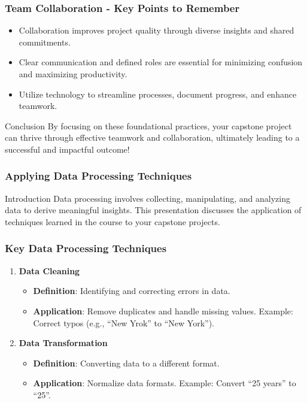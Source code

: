 \documentclass[aspectratio=169]{beamer}
\begin{document}
\begin{frame}[fragile]
    \frametitle{Team Collaboration - Key Points to Remember}
    \begin{itemize}
        \item Collaboration improves project quality through diverse insights and shared commitments.
        \item Clear communication and defined roles are essential for minimizing confusion and maximizing productivity.
        \item Utilize technology to streamline processes, document progress, and enhance teamwork.
    \end{itemize}
    
    \begin{block}{Conclusion}
        By focusing on these foundational practices, your capstone project can thrive through effective teamwork and collaboration, ultimately leading to a successful and impactful outcome!
    \end{block}
\end{frame}

\begin{frame}
    \frametitle{Applying Data Processing Techniques}
    \begin{block}{Introduction}
        Data processing involves collecting, manipulating, and analyzing data to derive meaningful insights. This presentation discusses the application of techniques learned in the course to your capstone projects.
    \end{block}
\end{frame}

\begin{frame}
    \frametitle{Key Data Processing Techniques}
    \begin{enumerate}
        \item \textbf{Data Cleaning} 
            \begin{itemize}
                \item \textbf{Definition}: Identifying and correcting errors in data.
                \item \textbf{Application}: Remove duplicates and handle missing values. Example: Correct typos (e.g., ``New Yrok'' to ``New York'').
            \end{itemize}
        \item \textbf{Data Transformation} 
            \begin{itemize}
                \item \textbf{Definition}: Converting data to a different format.
                \item \textbf{Application}: Normalize data formats. Example: Convert ``25 years'' to ``25''.
            \end{itemize}
    \end{enumerate}
\end{frame}
\end{document}
